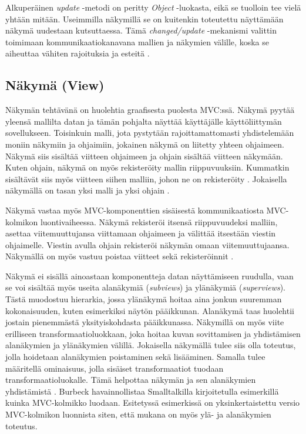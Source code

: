 \documentclass[utf8]{gradu3}
\begin{document}
Alkuperäinen \textit{update} -metodi on peritty \textit{Object} -luokasta, eikä se tuolloin tee vielä yhtään mitään. Useimmilla näkymillä se on kuitenkin toteutettu näyttämään näkymä uudestaan kutsuttaessa. Tämä \textit{changed/update} -mekanismi valittin toimimaan kommunikaatiokanavana mallien ja näkymien välille, koska se aiheuttaa vähiten rajoituksia ja esteitä \parencite{burbeck}. 

\subsection{Näkymä (View)}
Näkymän tehtävänä on huolehtia graafisesta puolesta MVC:ssä. Näkymä pyytää yleensä mallilta datan ja tämän pohjalta näyttää käyttäjälle käyttöliittymän sovellukseen. Toisinkuin malli, jota pystytään rajoittamattomasti yhdistelemään moniin näkymiin ja ohjaimiin, jokainen näkymä on liitetty yhteen ohjaimeen.  Näkymä siis sisältää viitteen ohjaimeen ja ohjain sisältää viitteen näkymään. Kuten ohjain, näkymä on myös rekisteröity mallin riippuvuuksiin. Kummatkin sisältävät siis myös viitteen siihen malliin, johon ne on rekisteröity \parencite{burbeck}. Jokaisella näkymällä on tasan yksi malli ja yksi ohjain \parencite[s. 7]{krasner_desc}.

Näkymä vastaa myös MVC-komponenttien sisäisestä kommunikaatiosta MVC-kolmikon luontivaiheessa. Näkymä rekisteröi itsensä  riippuvuudeksi malliin, asettaa viitemuuttujansa viittamaan ohjaimeen ja välittää itsestään viestin ohjaimelle. Viestin avulla ohjain rekisteröi näkymän omaan viitemuuttujaansa. Näkymällä on myös vastuu poistaa viitteet sekä rekisteröinnit \parencite{burbeck}. 

Näkymä ei sisällä ainoastaan komponentteja datan näyttämiseen ruudulla, vaan se voi sisältää myös useita alanäkymiä (\emph{subviews}) ja ylänäkymiä (\emph{superviews}). Tästä muodostuu hierarkia, jossa ylänäkymä hoitaa aina jonkun suuremman kokonaisuuden, kuten esimerkiksi näytön pääikkunan. Alanäkymä taas huolehtii jostain pienemmästä yksityiskohdasta pääikkunassa. Näkymillä on myös viite erilliseen transformaatioluokkaan, joka hoitaa kuvan sovittamisen ja yhdistämisen alanäkymien ja ylänäkymien välillä. Jokaisella näkymällä tulee siis olla toteutus, jolla hoidetaan alanäkymien poistaminen sekä lisääminen. Samalla tulee määritellä ominaisuus, jolla sisäiset transformaatiot tuodaan transformaatioluokalle. Tämä helpottaa näkymän ja sen alanäkymien yhdistämistä \parencite[s. 8]{krasner_desc}. Burbeck havainnollistaa Smalltalkilla kirjoitetulla esimerkillä kuinka MVC-kolmikko luodaan. Esitetyssä esimerkissä on yksinkertaistettu versio MVC-kolmikon luonnista siten, että mukana on myös ylä- ja alanäkymien toteutus.
\end{document}

